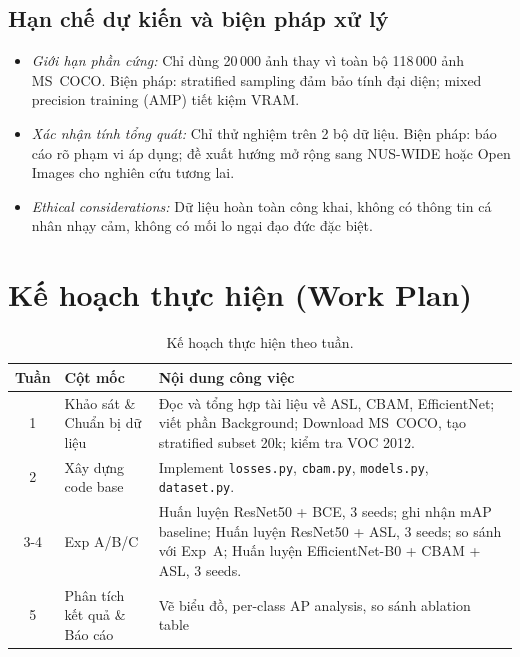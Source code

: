 \documentclass{article}
\begin{document}
\subsection{Hạn chế dự kiến và biện pháp xử lý}

\begin{itemize}[leftmargin=1.8em]
  \item \textit{Giới hạn phần cứng:} Chỉ dùng 20\,000 ảnh thay vì toàn bộ
        118\,000 ảnh MS~COCO. Biện pháp: stratified sampling đảm bảo tính đại
        diện; mixed precision training (AMP) tiết kiệm VRAM.
  \item \textit{Xác nhận tính tổng quát:} Chỉ thử nghiệm trên 2 bộ dữ liệu.
        Biện pháp: báo cáo rõ phạm vi áp dụng; đề xuất hướng mở rộng sang
        NUS-WIDE hoặc Open Images cho nghiên cứu tương lai.
  \item \textit{Ethical considerations:} Dữ liệu hoàn toàn công khai, không
        có thông tin cá nhân nhạy cảm, không có mối lo ngại đạo đức đặc biệt.
\end{itemize}

\section{Kế hoạch thực hiện (Work Plan)}

\begin{table}[H]
  \caption{Kế hoạch thực hiện theo tuần.}
  \label{tab:workplan}
  \centering
  \small
  \begin{tabular}{clp{7.5cm}}
    \toprule
    \textbf{Tuần} & \textbf{Cột mốc} & \textbf{Nội dung công việc} \\
    \midrule
    1  & Khảo sát \& Chuẩn bị dữ liệu   & Đọc và tổng hợp tài liệu về ASL, CBAM, EfficientNet; viết phần Background; Download MS~COCO, tạo stratified subset 20k; kiểm tra VOC 2012. \\
    2  & Xây dựng code base & Implement \texttt{losses.py}, \texttt{cbam.py}, \texttt{models.py}, \texttt{dataset.py}. \\
    3-4     & Exp A/B/C   & Huấn luyện ResNet50 + BCE, 3 seeds; ghi nhận mAP baseline; Huấn luyện ResNet50 + ASL, 3 seeds; so sánh với Exp~A; Huấn luyện EfficientNet-B0 + CBAM + ASL, 3 seeds. \\
    5    & Phân tích kết quả \& Báo cáo  & Vẽ biểu đồ, per-class AP analysis, so sánh ablation table \\
    \bottomrule
  \end{tabular}
\end{table}
\end{document}
